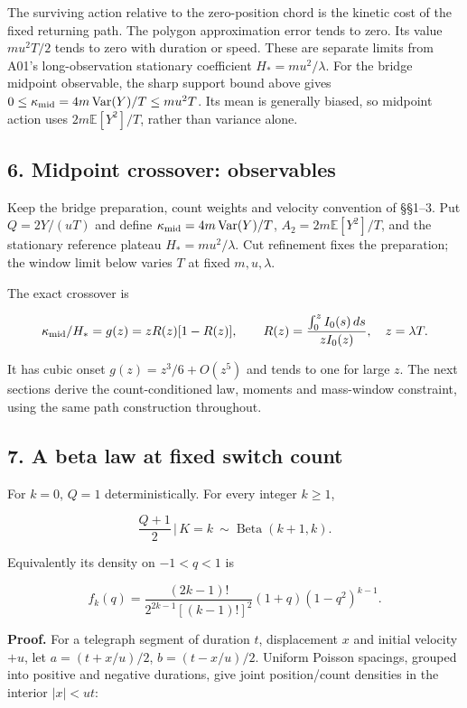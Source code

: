 \documentclass[11pt,a4paper]{article}
\begin{document}
The surviving action relative to the zero-position chord is the kinetic
cost of the fixed returning path. The polygon approximation error tends
to zero. Its value \(mu^2T/2\) tends to zero with duration or speed.
These are separate limits from A01's long-observation stationary
coefficient \(H_*=mu^2/\lambda\). For the bridge midpoint observable,
the sharp support bound above gives
\(0\le\kappa_{\rm mid}=4m\operatorname{Var}(Y)/T\le mu^2T\). Its mean is
generally biased, so midpoint action uses \(2m\mathbb E[Y^2]/T\), rather
than variance alone.

\hypertarget{midpoint-crossover-observables}{%
\subsection{6. Midpoint crossover:
observables}\label{midpoint-crossover-observables}}

Keep the bridge preparation, count weights and velocity convention of
§§1--3. Put \(Q=2Y/(uT)\) and define
\(\kappa_{\rm mid}=4m\operatorname{Var}(Y)/T\),
\(A_2=2m\mathbb E[Y^2]/T\), and the stationary reference plateau
\(H_*=mu^2/\lambda\). Cut refinement fixes the preparation; the window
limit below varies \(T\) at fixed \(m,u,\lambda\).

The exact crossover is

\[\kappa_{\rm mid}/H_*=g(z)=zR(z)[1-R(z)],\qquad
R(z)=\frac{\int_0^z I_0(s)\,ds}{zI_0(z)},\quad z=\lambda T.\]

It has cubic onset \(g(z)=z^3/6+O(z^5)\) and tends to one for large
\(z\). The next sections derive the count-conditioned law, moments and
mass-window constraint, using the same path construction throughout.

\hypertarget{a-beta-law-at-fixed-switch-count}{%
\subsection{7. A beta law at fixed switch
count}\label{a-beta-law-at-fixed-switch-count}}

For \(k=0\), \(Q=1\) deterministically. For every integer \(k\ge1\),

\[\boxed{\frac{Q+1}{2}\,\bigg|\,K=k\ \sim\operatorname{Beta}(k+1,k).}\]

Equivalently its density on \(-1<q<1\) is

\[f_k(q)=\frac{(2k-1)!}{2^{2k-1}[(k-1)!]^2}
                  (1+q)(1-q^2)^{k-1}.\]

\textbf{Proof.} For a telegraph segment of duration \(t\), displacement
\(x\) and initial velocity \(+u\), let \(a=(t+x/u)/2\), \(b=(t-x/u)/2\).
Uniform Poisson spacings, grouped into positive and negative durations,
give joint position/count densities in the interior \(|x|<ut\):
\end{document}
